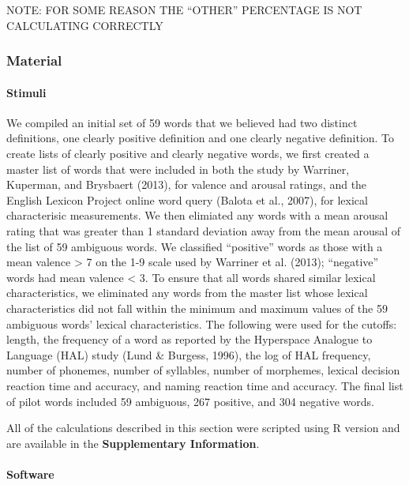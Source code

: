 \documentclass[man]{apa6}
\let\oldparagraph\paragraph
\renewcommand{\paragraph}[1]{\oldparagraph{#1}\mbox{}}
\begin{document}
NOTE: FOR SOME REASON THE \enquote{OTHER} PERCENTAGE IS NOT CALCULATING CORRECTLY

\hypertarget{material}{%
\subsubsection{Material}\label{material}}

\hypertarget{stimuli}{%
\paragraph{Stimuli}\label{stimuli}}

We compiled an initial set of 59 words that we believed had two distinct definitions, one clearly positive definition and one clearly negative definition. To create lists of clearly positive and clearly negative words, we first created a master list of words that were included in both the study by Warriner, Kuperman, and Brysbaert (2013), for valence and arousal ratings, and the English Lexicon Project online word query (Balota et al., 2007), for lexical characterisic measurements. We then elimiated any words with a mean arousal rating that was greater than 1 standard deviation away from the mean arousal of the list of 59 ambiguous words. We classified \enquote{positive} words as those with a mean valence \textgreater{} 7 on the 1-9 scale used by Warriner et al. (2013); \enquote{negative} words had mean valence \textless{} 3. To ensure that all words shared similar lexical characteristics, we eliminated any words from the master list whose lexical characteristics did not fall within the minimum and maximum values of the 59 ambiguous words' lexical characteristics. The following were used for the cutoffs: length, the frequency of a word as reported by the Hyperspace Analogue to Language (HAL) study (Lund \& Burgess, 1996), the log of HAL frequency, number of phonemes, number of syllables, number of morphemes, lexical decision reaction time and accuracy, and naming reaction time and accuracy. The final list of pilot words included 59 ambiguous, 267 positive, and 304 negative words.

All of the calculations described in this section were scripted using R version and are available in the \textbf{Supplementary Information}.

\hypertarget{software}{%
\paragraph{Software}\label{software}}
\end{document}

